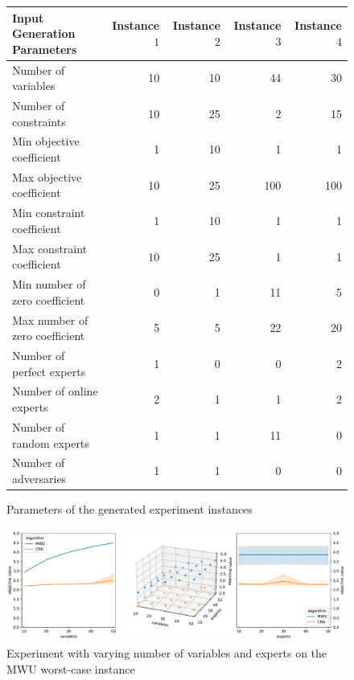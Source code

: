 \begin{figure}[!ht]
\centering
\begin{tabular}{l|r|r|r|r}
Input Generation Parameters & Instance $1$ & Instance $2$ & Instance $3$ & Instance $4$ \\
\hline
Number of variables            & 10 & 10 & 44  & 30 \\
Number of constraints          & 10 & 25 & 2   & 15 \\
Min objective coefficient      & 1  & 10 & 1   & 1  \\
Max objective coefficient      & 10 & 25 & 100 & 100\\
Min constraint coefficient     & 1  & 10 & 1   & 1 \\
Max constraint coefficient     & 10 & 25 & 1   & 1 \\
Min number of zero coefficient & 0  &  1 & 11  & 5 \\
Max number of zero coefficient & 5  &  5 & 22  & 20 \\
Number of perfect experts      & 1  &  0 & 0   & 2 \\
Number of online experts       & 2  &  1 & 1   & 2 \\
Number of random experts       & 1  &  1 & 11  & 0 \\
Number of adversaries          & 1  &  1 & 0   & 0 \\
\end{tabular}
\caption{Parameters of the generated experiment instances}
\label{fig:exp-params}
\end{figure}

\begin{figure}[!ht]
    \centering
    \includegraphics[width=\linewidth]{../paper/Img/worst_case_figure.pdf}
    \caption{Experiment with varying number of variables and experts on the MWU worst-case instance}
    \label{fig:exp2-3d}
\end{figure}
